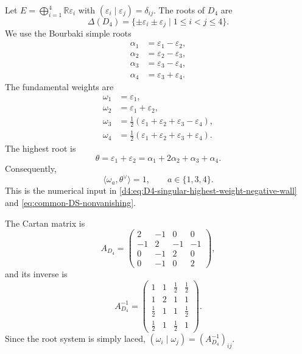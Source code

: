 \documentclass[11pt,reqno]{amsart}
\theoremstyle{definition}
\theoremstyle{remark}
\begin{document}
Let \(E=\bigoplus_{i=1}^{4}\mathbb R\varepsilon_i\) with
\((\varepsilon_i\mid\varepsilon_j)=\delta_{ij}\).  The roots of \(D_4\)
are
\begin{equation*}
  \Delta(D_4)
  =
  \{\pm\varepsilon_i\pm\varepsilon_j
    \mid 1\le i<j\le4\}.
\end{equation*}
We use the Bourbaki simple roots
\begin{equation*}
\begin{aligned}
  \alpha_1&=\varepsilon_1-\varepsilon_2,\\
  \alpha_2&=\varepsilon_2-\varepsilon_3,\\
  \alpha_3&=\varepsilon_3-\varepsilon_4,\\
  \alpha_4&=\varepsilon_3+\varepsilon_4.
\end{aligned}
\end{equation*}
The fundamental weights are
\begin{equation*}
\begin{aligned}
  \omega_1&=\varepsilon_1,\\
  \omega_2&=\varepsilon_1+\varepsilon_2,\\
  \omega_3&=\frac12
    (\varepsilon_1+\varepsilon_2+\varepsilon_3-\varepsilon_4),\\
  \omega_4&=\frac12
    (\varepsilon_1+\varepsilon_2+\varepsilon_3+\varepsilon_4).
\end{aligned}
\end{equation*}
The highest root is
\begin{equation*}
  \theta
  =
  \varepsilon_1+\varepsilon_2
  =
  \alpha_1+2\alpha_2+\alpha_3+\alpha_4.
\end{equation*}
Consequently,
\begin{equation*}
  \langle\omega_a,\theta^\vee\rangle=1,
  \qquad
  a\in\{1,3,4\}.
\end{equation*}
This is the numerical input in
\eqref{d4:eq:D4-singular-highest-weight-negative-wall} and
\eqref{eq:common-DS-nonvanishing}.

The Cartan matrix is
\begin{equation*}
  A_{D_4}
  =
  \begin{pmatrix}
    2&-1&0&0\\
    -1&2&-1&-1\\
    0&-1&2&0\\
    0&-1&0&2
  \end{pmatrix},
\end{equation*}
and its inverse is
\begin{equation*}
  A_{D_4}^{-1}
  =
  \begin{pmatrix}
    1&1&\frac12&\frac12\\
    1&2&1&1\\
    \frac12&1&1&\frac12\\
    \frac12&1&\frac12&1
  \end{pmatrix}.
\end{equation*}
Since the root system is simply laced,
\((\omega_i\mid\omega_j)=(A_{D_4}^{-1})_{ij}\).
\end{document}
